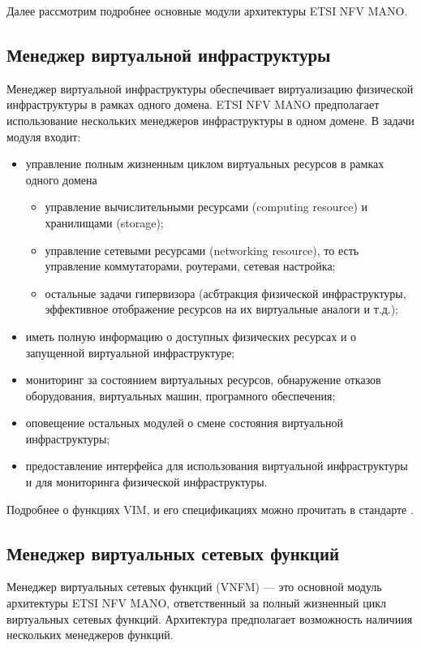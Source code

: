 \documentclass[oneside,final,14pt,a4paper]{extreport}
\begin{document}
Далее рассмотрим подробнее основные модули архитектуры ETSI NFV MANO.

\subsection{Менеджер виртуальной инфраструктуры}
Менеджер виртуальной инфраструктуры обеспечивает виртуализацию физической инфраструктуры в рамках одного домена. ETSI NFV MANO предполагает использование нескольких менеджеров инфраструктуры в одном домене. В задачи модуля входит:

\begin{itemize}
	\item управление полным жизненным циклом виртуальных ресурсов в рамках одного домена
	\begin{itemize}
		\item управление вычислительными ресурсами (computing resource) и хранилищами (storage);
		\item управление сетевыми ресурсами (networking resource), то есть управление коммутаторами, роутерами, сетевая настройка;
		\item остальные задачи гипервизора (асбтракция физической инфраструктуры, эффективное отображение ресурсов на их виртуальные аналоги и т.д.);
	\end{itemize}
	\item иметь полную информацию о доступных физических ресурсах и о запущенной виртуальной инфраструктуре;
	\item мониторинг за состоянием виртуальных ресурсов, обнаружение отказов оборудования, виртуальных машин, програмного обеспечения;
	\item оповещение остальных модулей о смене состояния виртуальной инфраструктуры;
	\item предоставление интерфейса для использования виртуальной инфраструктуры и для мониторинга физической инфраструктуры.
\end{itemize}

Подробнее о функциях VIM, и его спецификациях можно прочитать в стандарте \cite{nfv-mano-official-2016-04}.

\subsection{Менеджер виртуальных сетевых функций}
Менеджер виртуальных сетевых функций (VNFM) --- это основной модуль архитектуры ETSI NFV MANO, ответственный за  полный жизненный цикл виртуальных сетевых функций. Архитектура предполагает возможность наличиия нескольких менеджеров функций.
\end{document}
